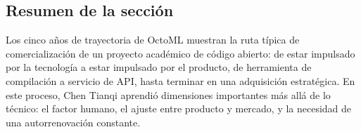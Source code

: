 \subsection{Resumen de la sección}

Los cinco años de trayectoria de OctoML muestran la ruta típica de comercialización de un proyecto académico de código abierto: de estar impulsado por la tecnología a estar impulsado por el producto, de herramienta de compilación a servicio de API, hasta terminar en una adquisición estratégica. En este proceso, Chen Tianqi aprendió dimensiones importantes más allá de lo técnico: el factor humano, el ajuste entre producto y mercado, y la necesidad de una autorrenovación constante.
